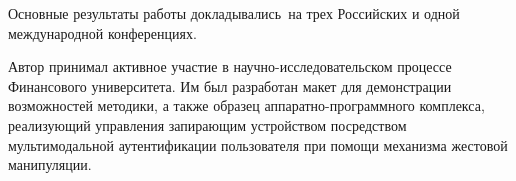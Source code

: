 
{\probation}
Основные результаты работы докладывались~на трех Российских и одной международной конференциях.

{\contribution} Автор принимал активное участие в научно-исследовательском процессе Финансового университета. Им был разработан макет для демонстрации возможностей методики, а также образец аппаратно-программного комплекса, реализующий управления запирающим устройством посредством мультимодальной аутентификации пользователя при помощи механизма жестовой манипуляции. 


